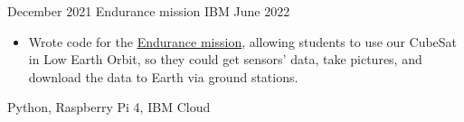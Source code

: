 %
%
%


\begin{projects}

    \project
        {December 2021}
        {Endurance mission}
        {IBM}
        {June 2022}
        {
            \begin{itemize}
                \item Wrote code for the \href{https://endurancein.space/}{\underline{Endurance mission}},
                      allowing students to use our CubeSat in Low Earth Orbit, so they could
                      get sensors' data, take pictures, and download the data to Earth via ground stations.
            \end{itemize}
        }
        {
            Python,
            Raspberry Pi 4,
            IBM Cloud
        }
    
    \emptySeparator




\end{projects}
